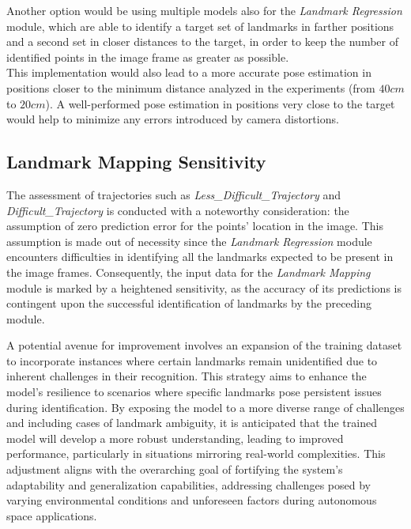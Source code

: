Another option would be using multiple models also for the \textit{Landmark Regression} module, which are able to identify a target set of landmarks in farther positions and a second set in closer distances to the target, in order to keep the number of identified points in the image frame as greater as possible.\\
This implementation would also lead to a more accurate pose estimation in positions closer to the minimum distance analyzed in the experiments (from $40 cm$ to $20cm$). A well-performed pose estimation in positions very close to the target would help to minimize any errors introduced by camera distortions.

\subsection{Landmark Mapping Sensitivity}
The assessment of trajectories such as \textit{Less\_Difficult\_Trajectory} and \textit{Difficult\_Trajectory} is conducted with a noteworthy consideration: the assumption of zero prediction error for the points' location in the image. This assumption is made out of necessity since the \textit{Landmark Regression} module encounters difficulties in identifying all the landmarks expected to be present in the image frames. Consequently, the input data for the \textit{Landmark Mapping} module is marked by a heightened sensitivity, as the accuracy of its predictions is contingent upon the successful identification of landmarks by the preceding module.

A potential avenue for improvement involves an expansion of the training dataset to incorporate instances where certain landmarks remain unidentified due to inherent challenges in their recognition. This strategy aims to enhance the model's resilience to scenarios where specific landmarks pose persistent issues during identification. By exposing the model to a more diverse range of challenges and including cases of landmark ambiguity, it is anticipated that the trained model will develop a more robust understanding, leading to improved performance, particularly in situations mirroring real-world complexities. This adjustment aligns with the overarching goal of fortifying the system's adaptability and generalization capabilities, addressing challenges posed by varying environmental conditions and unforeseen factors during autonomous space applications.

